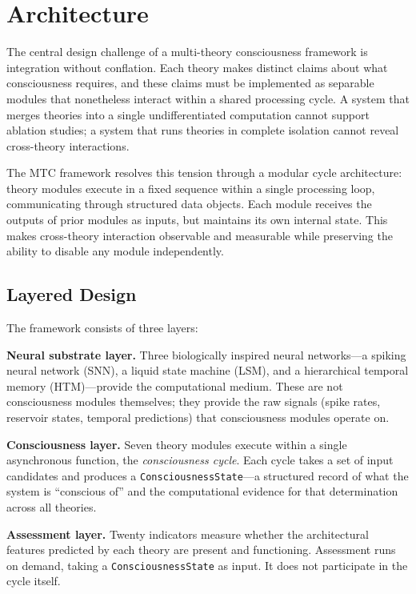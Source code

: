 \section{Architecture}
\label{sec:architecture}

The central design challenge of a multi-theory consciousness framework is integration without conflation. Each theory makes distinct claims about what consciousness requires, and these claims must be implemented as separable modules that nonetheless interact within a shared processing cycle. A system that merges theories into a single undifferentiated computation cannot support ablation studies; a system that runs theories in complete isolation cannot reveal cross-theory interactions.

The MTC framework resolves this tension through a modular cycle architecture: theory modules execute in a fixed sequence within a single processing loop, communicating through structured data objects. Each module receives the outputs of prior modules as inputs, but maintains its own internal state. This makes cross-theory interaction observable and measurable while preserving the ability to disable any module independently.

\subsection{Layered Design}

The framework consists of three layers:

\textbf{Neural substrate layer.} Three biologically inspired neural networks---a spiking neural network (SNN), a liquid state machine (LSM), and a hierarchical temporal memory (HTM)---provide the computational medium. These are not consciousness modules themselves; they provide the raw signals (spike rates, reservoir states, temporal predictions) that consciousness modules operate on.

\textbf{Consciousness layer.} Seven theory modules execute within a single asynchronous function, the \textit{consciousness cycle}. Each cycle takes a set of input candidates and produces a \texttt{ConsciousnessState}---a structured record of what the system is ``conscious of'' and the computational evidence for that determination across all theories.

\textbf{Assessment layer.} Twenty indicators measure whether the architectural features predicted by each theory are present and functioning. Assessment runs on demand, taking a \texttt{ConsciousnessState} as input. It does not participate in the cycle itself.

